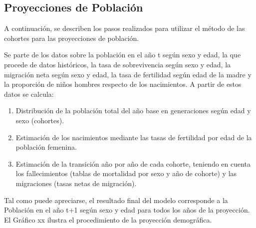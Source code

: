 \subsection{Proyecciones de Población}

A continuación, se describen los pasos realizados para utilizar el
método de las cohortes para las proyecciones de población.

Se parte de los datos sobre la población en el año t según sexo y edad,
la que procede de datos históricos, la tasa de sobrevivencia según sexo
y edad, la migración neta según sexo y edad, la tasa de fertilidad según
edad de la madre y la proporción de niños hombres respecto de los
nacimientos. A partir de estos datos se calcula:

\begin{enumerate}
\item Distribución de la población total del año base en generaciones según edad y sexo (cohortes).
\item Estimación de los nacimientos mediante las tasas de fertilidad por edad de la población femenina.
\item Estimación de la transición año por año de cada cohorte, teniendo en cuenta los fallecimientos (tablas de mortalidad por sexo y año de cohorte) y las migraciones (tasas netas de migración).
\end{enumerate}

Tal como puede apreciarse, el resultado final del modelo corresponde a
la Población en el año t+1 según sexo y edad para todos los años de la
proyección. El Gráfico xx ilustra el procedimiento de la proyección
demográfica.

\newpage

